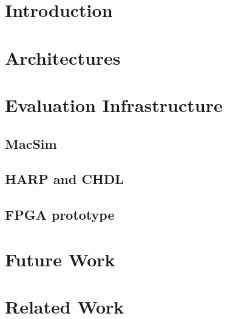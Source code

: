 \documentclass[pageno]{jpaper}
\begin{document}
\section{Introduction}


\section{Architectures}


\section{Evaluation Infrastructure}


\subsection{MacSim}


\subsection{HARP and CHDL}


\subsection{FPGA prototype}


\section{Future Work}


\section{Related Work}




\end{document}
